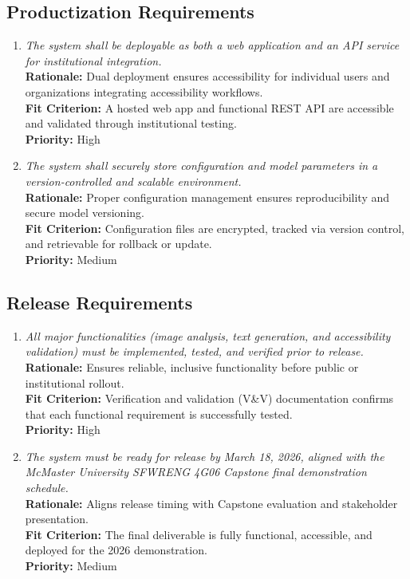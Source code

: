 \documentclass[12pt]{article}
\begin{document}
\subsection{Productization Requirements}

\begin{enumerate}[label=OER-PR\arabic*., wide=0pt, leftmargin=*]
  \item \emph{The system shall be deployable as both a web
    application and an API service for institutional integration.}\\[2mm]
    {\bf Rationale:} Dual deployment ensures accessibility for
    individual users and organizations integrating accessibility workflows.\\
    {\bf Fit Criterion:} A hosted web app and functional REST API are
    accessible and validated through institutional testing.\\
    {\bf Priority:} High

  \item \emph{The system shall securely store configuration and model
    parameters in a version-controlled and scalable environment.}\\[2mm]
    {\bf Rationale:} Proper configuration management ensures
    reproducibility and secure model versioning.\\
    {\bf Fit Criterion:} Configuration files are encrypted, tracked
    via version control, and retrievable for rollback or update.\\
    {\bf Priority:} Medium
\end{enumerate}

\subsection{Release Requirements}

\begin{enumerate}[label=OER-RL\arabic*., wide=0pt, leftmargin=*]
  \item \emph{All major functionalities (image analysis, text
      generation, and accessibility validation) must be implemented,
    tested, and verified prior to release.}\\[2mm]
    {\bf Rationale:} Ensures reliable, inclusive functionality before
    public or institutional rollout.\\
    {\bf Fit Criterion:} Verification and validation (V\&V)
    documentation confirms that each functional requirement is
    successfully tested.\\
    {\bf Priority:} High

  \item \emph{The system must be ready for release by March 18, 2026,
      aligned with the McMaster University SFWRENG 4G06 Capstone final
    demonstration schedule.}\\[2mm]
    {\bf Rationale:} Aligns release timing with Capstone evaluation
    and stakeholder presentation.\\
    {\bf Fit Criterion:} The final deliverable is fully functional,
    accessible, and deployed for the 2026 demonstration.\\
    {\bf Priority:} Medium
\end{enumerate}
\end{document}
